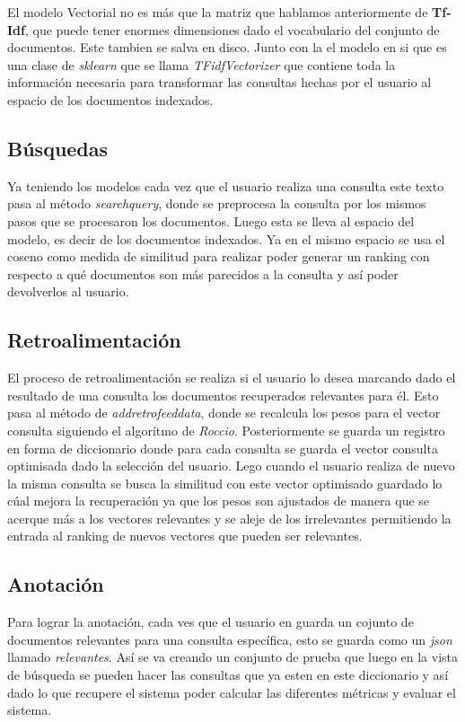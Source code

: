 \documentclass{llncs}
\begin{document}
    El modelo Vectorial no es más que la matriz que hablamos anteriormente de \textbf{Tf-Idf}, que puede tener enormes dimensiones dado el vocabulario del conjunto de documentos. Este tambien se salva en disco. Junto con la el modelo en si que es una clase de \emph{sklearn} que se llama \emph{TFidfVectorizer} que contiene toda la información necesaria para transformar las consultas hechas por el usuario al espacio de los documentos indexados. 

  \subsection{Búsquedas}
    Ya teniendo los modelos cada vez que el usuario realiza una consulta este texto pasa al método \emph{searchquery}, donde se preprocesa la consulta por los mismos pasos que se procesaron los documentos. Luego esta se lleva al espacio del modelo, es decir de los documentos indexados. Ya en el mismo espacio se usa el coseno como medida de similitud para realizar poder generar un ranking con respecto a qué documentos son más parecidos a la consulta y así poder devolverlos al usuario.

  \subsection{Retroalimentación}

    El proceso de retroalimentación se realiza si el usuario lo desea marcando dado el resultado de una consulta los documentos recuperados relevantes para él. Esto pasa al método de \emph{addretrofeeddata}, donde se recalcula los pesos para el vector consulta siguiendo el algorítmo de \emph{Roccio}. Posteriormente se guarda un registro en forma de diccionario donde para cada consulta se guarda el vector consulta optimisada dado la selección del usuario. Lego cuando el usuario realiza de nuevo la misma consulta se busca la similitud con este vector optimisado guardado lo cúal mejora la recuperación ya que los pesos son ajustados de manera que se acerque más a los vectores relevantes y se aleje de los irrelevantes permitiendo la entrada al ranking de nuevos vectores que pueden ser relevantes.

  \subsection{Anotación}
   
    Para lograr la anotación, cada ves que el usuario en guarda un cojunto de documentos relevantes para una consulta específica, esto se guarda como un \emph{json}  llamado \emph{relevantes}. Así se va creando un conjunto de prueba que luego en la vista de búsqueda se pueden hacer las consultas que ya esten en este diccionario y así dado lo que recupere el sistema poder calcular las diferentes métricas y evaluar el sistema.  
\end{document}

